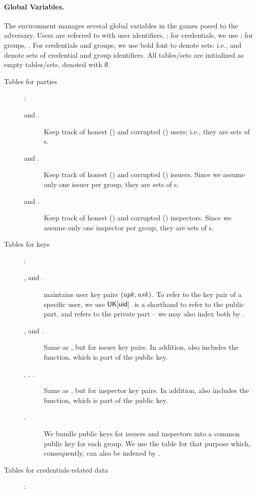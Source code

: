 \paragraph{Global Variables.} %
The environment manages several global variables in the games posed to the
adversary. Users are referred to with user identifiers, \uid; for credentials,
we use \cid; for groups, \gid. For credentials and groups, we use bold font to
denote sets: i.e., \scid and \sgid denote sets of credential and group
identifiers. All tables/sets are initialized as empty tables/sets, denoted
with $\emptyset$.

\begin{description}
\item[Tables for parties]:
  \begin{description}
  \item[\HU and \CU.] Keep track of honest (\HU) and corrupted (\CU) users;
    i.e., they are sets of {\uid}s.
  \item[\HI and \CI.] Keep track of honest (\HI) and corrupted (\CI) issuers.
    Since we assume only one issuer per group, they are sets of {\gid}s.
  \item[\HO and \CO.] Keep track of honest (\HO) and corrupted (\CO) inspectors.
    Since we assume only one inspector per group, they are sets of {\gid}s.
  \end{description}
\item[Tables for keys]:
  \begin{description}
  \item[\UK, \PUBUK and \PRVUK.] \UK maintains user key pairs $(upk,usk)$.
    To refer to the key pair of a specific user, we use $\mathsf{UK}[\mathsf{uid}]$. \PUBUK
    is a shorthand to refer to the public part, and \PRVUK refers to the
    private part -- we may also index both by \uid.
  \item[\IK, \PUBIK and \PRVIK.] Same as \UK, but for issuer key pairs. In
    addition, \IK also includes the \fissue function, which is part of the
    public key.
  \item[\OK, \PUBOK, \PRVOK.] Same as \UK, but for inspector key pairs. In
    addition, \OK also includes the \finsp function, which is part of the
    public key.
  \item[\GK.] We bundle public keys for issuers and inspectors into a common
    public key for each group. We use the table \GK for that purpose which,
    consequently, can also be indexed by \gid.
  \end{description}
\item[Tables for credentials-related data]:

\end{description}
